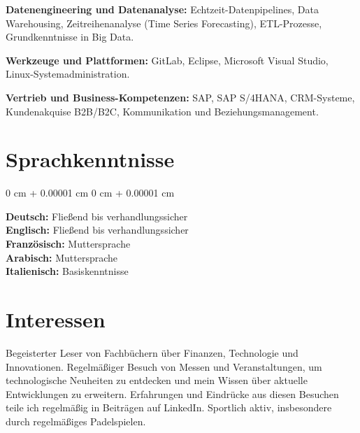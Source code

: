 \documentclass[10pt, letterpaper]{article}
\newenvironment{onecolentry}{
    \begin{adjustwidth}{
        0 cm + 0.00001 cm
    }{
        0 cm + 0.00001 cm
    }
}{
    \end{adjustwidth}
} %
\begin{document}
\textbf{Datenengineering und Datenanalyse:}  
Echtzeit-Datenpipelines, Data Warehousing, Zeitreihenanalyse (Time Series Forecasting), ETL-Prozesse, Grundkenntnisse in Big Data.

\textbf{Werkzeuge und Plattformen:}  
GitLab, Eclipse, Microsoft Visual Studio, Linux-Systemadministration.

\textbf{Vertrieb und Business-Kompetenzen:}  
SAP, SAP S/4HANA, CRM-Systeme, Kundenakquise B2B/B2C, Kommunikation und Beziehungsmanagement.

\section{Sprachkenntnisse}

\begin{onecolentry}
    \textbf{Deutsch:} Fließend bis verhandlungssicher \\
    \textbf{Englisch:} Fließend bis verhandlungssicher \\
    \textbf{Französisch:} Muttersprache \\
    \textbf{Arabisch:} Muttersprache \\
    \textbf{Italienisch:} Basiskenntnisse
\end{onecolentry}

\section{Interessen}

Begeisterter Leser von Fachbüchern über Finanzen, Technologie und Innovationen.  
Regelmäßiger Besuch von Messen und Veranstaltungen, um technologische Neuheiten zu entdecken und mein Wissen über aktuelle Entwicklungen zu erweitern.  
Erfahrungen und Eindrücke aus diesen Besuchen teile ich regelmäßig in Beiträgen auf LinkedIn.  
Sportlich aktiv, insbesondere durch regelmäßiges Padelspielen.
    
\end{document}
